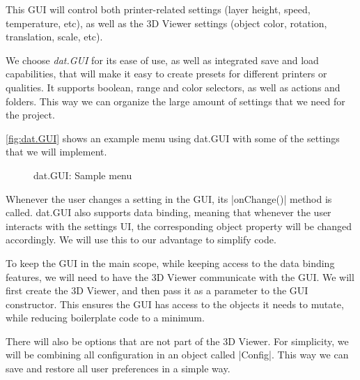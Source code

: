 This GUI will control both printer-related settings (layer height, speed, temperature, etc), as well as the 3D Viewer settings (object color, rotation, translation, scale, etc).

We choose \emph{dat.GUI} \cite{dat.GUI} for its ease of use, as well as integrated save and load capabilities, that will make it easy to create presets for different printers or qualities. It supports boolean, range and color selectors, as well as actions and folders. This way we can organize the large amount of settings that we need for the project. 

\autoref{fig:dat.GUI} shows an example menu using dat.GUI with some of the settings that we will implement.

\begin{figure}[H]
    \noindent{}
    \caption{dat.GUI: Sample menu}
    \label{fig:dat.GUI}
\end{figure}


Whenever the user changes a setting in the GUI, its \code|onChange()| method is called. dat.GUI also supports data binding, meaning that whenever the user interacts with the settings UI, the corresponding object property will be changed accordingly. We will use this to our advantage to simplify code.

To keep the GUI in the main scope, while keeping access to the data binding features, we will need to have the 3D Viewer communicate with the GUI. We will first create the 3D Viewer, and then pass it as a parameter to the GUI constructor. This ensures the GUI has access to the objects it needs to mutate, while reducing boilerplate code to a minimum. 

There will also be options that are not part of the 3D Viewer. For simplicity, we will be combining all configuration in an object called \code|Config|. This way we can save and restore all user preferences in a simple way.


